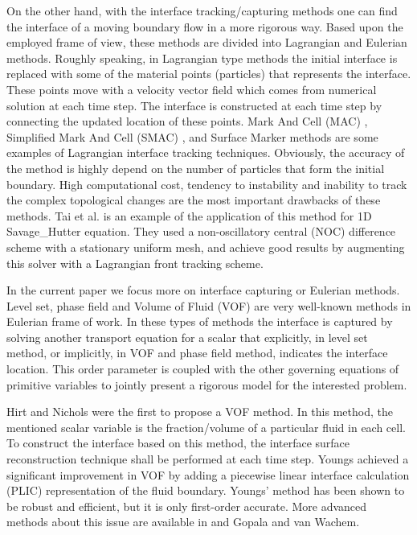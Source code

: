 \documentclass[letterpaper,10pt]{article}
\begin{document}
On the other hand, with the interface tracking/capturing methods one can find the interface of a moving boundary flow in a more rigorous way. Based upon the employed frame of view, these methods 
are divided into Lagrangian and Eulerian methods.
Roughly speaking, in Lagrangian type methods the initial interface is replaced with some of the material points (particles) that represents the interface. These points move with a velocity vector 
field which comes from numerical solution at each time step. The interface is constructed at each time step by connecting the updated location of these points. 
Mark And Cell (MAC) \cite{Harlow1965}, Simplified Mark And Cell (SMAC)  \cite{Cheng1995}, and Surface Marker \citep{Wrobel1991} methods are some examples of Lagrangian interface tracking techniques.
Obviously, the accuracy of the method is highly depend on the number 
of particles that form the initial boundary. 
High computational cost, tendency to instability and inability to track the complex topological changes are the most important drawbacks of these methods. 
Tai et al. \cite{Tai2002} is an example of the application of this method for 1D Savage\_Hutter equation. They used a non-oscillatory central (NOC) difference scheme with a stationary uniform mesh, 
and achieve good results by augmenting this solver with a Lagrangian front tracking scheme.\newline

In the current paper we focus more on interface capturing or Eulerian methods. Level set, phase field and Volume of Fluid (VOF) are very well-known methods in Eulerian frame of work.
In these types of methods the interface is captured by solving another transport equation for a scalar that explicitly, in level set method, or implicitly, in VOF and phase field method, indicates 
the interface location. This order parameter is coupled with the other governing equations of primitive variables to jointly present a rigorous model for the interested problem.\newline



Hirt and Nichols \cite{hirt1981vfv} were the first to propose a VOF method. 
In this method, the mentioned scalar variable is the fraction/volume of a particular fluid in each cell.
To construct the interface based on this method, the interface surface reconstruction technique shall be performed at each time step. Youngs \cite{youngs1982tdm} achieved a significant improvement 
in VOF by adding a piecewise linear interface calculation (PLIC) representation of the fluid boundary. Youngs' method has been shown to be robust and efficient, but it is only first-order accurate. 
More advanced methods about this issue are available in \cite{gerlach2006cvf} and Gopala and van Wachem\cite{gopala2008vfm}. 
\end{document}
